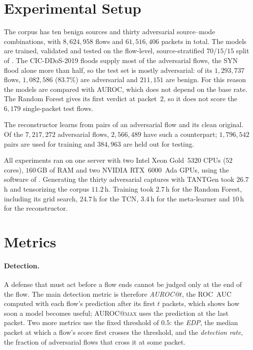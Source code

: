 \section{Experimental Setup}\label{sec:eval-setup}

The corpus has ten benign sources and thirty adversarial source--mode combinations,
with $8{,}624{,}958$ flows and $61{,}516{,}406$ packets in total. The models are trained,
validated and tested on the flow-level, source-stratified $70/15/15$ split of
. The CIC-DDoS-2019 floods supply most of the adversarial flows,
the SYN flood alone more than half, so the test set is mostly adversarial: of its
$1{,}293{,}737$ flows, $1{,}082{,}586$ ($83.7\%$) are adversarial and $211{,}151$ are
benign. For this reason the models are compared with AUROC, which does not depend on
the base rate. The Random Forest gives its first verdict at packet~$2$, so it does not
score the $6{,}179$ single-packet test flows.

The reconstructor learns from pairs of an adversarial flow and its clean original. Of
the $7{,}217{,}272$ adversarial flows, $2{,}566{,}489$ have such a counterpart;
$1{,}796{,}542$ pairs are used for training and $384{,}963$ are held out for testing.

All experiments ran on one server with two Intel Xeon Gold~5320 CPUs ($52$ cores),
$160$\,GB of RAM and two NVIDIA RTX~6000~Ada GPUs, using the software of
. Generating the thirty adversarial captures with TANTGen took
$26.7$\,h and tensorizing the corpus $11.2$\,h. Training took $2.7$\,h for the Random
Forest, including its grid search, $24.7$\,h for the \ac{TCN}, $3.4$\,h for the
meta-learner and $10$\,h for the reconstructor.

\section{Metrics}\label{sec:eval-metrics}

\paragraph{Detection.} A defense that must act before a flow ends cannot be judged only
at the end of the flow. The main detection metric is therefore \emph{AUROC@$t$}, the
ROC~AUC computed with each flow's prediction after its first $t$ packets, which shows how
soon a model becomes useful; AUROC@\textsc{max} uses the prediction at the last packet.
Two more metrics use the fixed threshold of $0.5$: the \emph{\acf{EDP}}, the median
packet at which a flow's score first crosses the threshold, and the \emph{detection
rate}, the fraction of adversarial flows that cross it at some packet.

